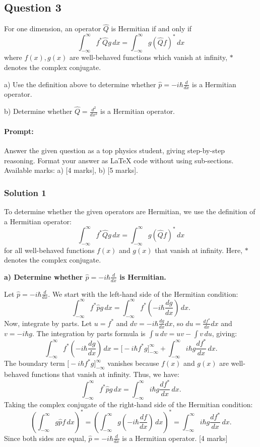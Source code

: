 \documentclass{article}
\begin{document}
\subsection{Question 3} 

For one dimension, an operator $\hat{Q}$ is Hermitian if and only if
\[
\int_{-\infty}^{\infty} f^* \hat{Q} g \, dx = \int_{-\infty}^{\infty} g (\hat{Q} f)^* \, dx
\]
where $f(x), g(x)$ are well-behaved functions which vanish at infinity, $*$ denotes the complex conjugate.

a) Use the definition above to determine whether $\hat{p} = -i\hbar \frac{d}{dx}$ is a Hermitian operator.

b) Determine whether $\hat{Q} = \frac{d^2}{dx^2}$ is a Hermitian operator.

\paragraph{Prompt: \\} 
Answer the given question as a top physics student, giving step-by-step reasoning. Format your answer as LaTeX code without using sub-sections. Available marks: a) [4 marks], b) [5 marks].

\subsubsection{Solution 1}
To determine whether the given operators are Hermitian, we use the definition of a Hermitian operator:
\[
\int_{-\infty}^\infty f^* \hat{Q} g \, dx = \int_{-\infty}^\infty g (\hat{Q} f)^* \, dx
\]
for all well-behaved functions $f(x)$ and $g(x)$ that vanish at infinity. Here, $*$ denotes the complex conjugate.

\textbf{a) Determine whether $\hat{p} = -i\hbar \frac{d}{dx}$ is Hermitian.}

Let $\hat{p} = -i\hbar \frac{d}{dx}$. We start with the left-hand side of the Hermitian condition:
\[
\int_{-\infty}^\infty f^* \hat{p} g \, dx = \int_{-\infty}^\infty f^* \left(-i\hbar \frac{d g}{dx}\right) \, dx.
\]
Now, integrate by parts. Let $u = f^*$ and $dv = -i\hbar \frac{d g}{dx} dx$, so $du = \frac{df^*}{dx} dx$ and $v = -i\hbar g$. The integration by parts formula is $\int u \, dv = uv - \int v \, du$, giving:
\[
\int_{-\infty}^\infty f^* \left(-i\hbar \frac{d g}{dx}\right) \, dx = \Big[ -i\hbar f^* g \Big]_{-\infty}^\infty + \int_{-\infty}^\infty i\hbar g \frac{d f^*}{dx} \, dx.
\]
The boundary term $\Big[ -i\hbar f^* g \Big]_{-\infty}^\infty$ vanishes because $f(x)$ and $g(x)$ are well-behaved functions that vanish at infinity. Thus, we have:
\[
\int_{-\infty}^\infty f^* \hat{p} g \, dx = \int_{-\infty}^\infty i\hbar g \frac{d f^*}{dx} \, dx.
\]
Taking the complex conjugate of the right-hand side of the Hermitian condition:
\[
\left(\int_{-\infty}^\infty g \hat{p} f \, dx \right)^* = \left(\int_{-\infty}^\infty g \left(-i\hbar \frac{d f}{dx}\right) \, dx \right)^* = \int_{-\infty}^\infty i\hbar g \frac{d f^*}{dx} \, dx.
\]
Since both sides are equal, $\hat{p} = -i\hbar \frac{d}{dx}$ is a Hermitian operator. \hfill [4 marks]
\end{document}
